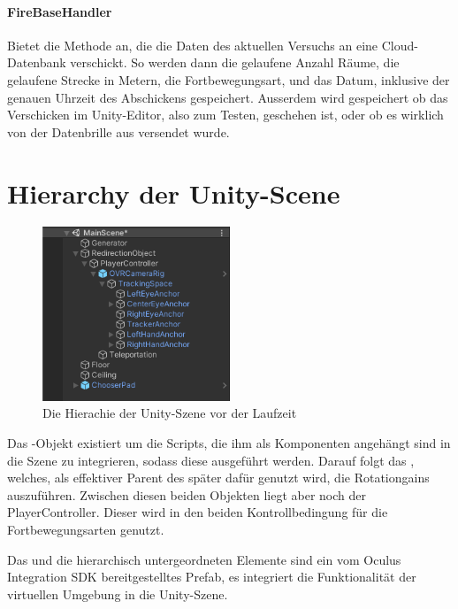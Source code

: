 \begin{multicols*}{2}
    \paragraph{FireBaseHandler}
    Bietet die Methode  an, die die Daten des aktuellen Versuchs an eine Cloud-Datenbank verschickt. So werden dann die gelaufene Anzahl Räume, die gelaufene Strecke in Metern, die Fortbewegungsart, und das Datum, inklusive der genauen Uhrzeit des Abschickens gespeichert. Ausserdem wird gespeichert ob das Verschicken im Unity-Editor, also zum Testen, geschehen ist, oder ob es wirklich von der Datenbrille aus versendet wurde.
\end{multicols*}

\section{Hierarchy der Unity-Scene}\label{sec:hierarchy}

\begin{figure}[!h]
    \centering
    \includegraphics[width=0.5\textwidth]{images/hierarchy.png}
    \caption{Die Hierachie der Unity-Szene vor der Laufzeit}\label{figure:hierarchy}
\end{figure}

Das -Objekt existiert um die Scripts, die ihm als Komponenten %
angehängt sind in die Szene zu integrieren, sodass diese ausgeführt werden. Darauf folgt das , welches, als effektiver Parent des  später dafür genutzt wird, die Rotationgains auszuführen. Zwischen diesen beiden Objekten liegt aber noch der PlayerController. Dieser wird in den beiden Kontrollbedingung für die Fortbewegungsarten genutzt.

Das  und die hierarchisch untergeordneten Elemente sind ein vom Oculus Integration SDK bereitgestelltes Prefab, es integriert die Funktionalität der virtuellen Umgebung in die Unity-Szene.

